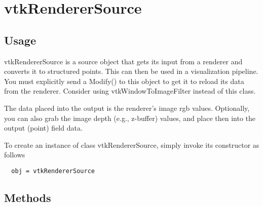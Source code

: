 \section{vtkRendererSource}

\subsection{Usage}

 vtkRendererSource is a source object that gets its input from a 
 renderer and converts it to structured points. This can then be 
 used in a visualization pipeline. You must explicitly send a 
 Modify() to this object to get it to reload its data from the
 renderer. Consider using vtkWindowToImageFilter instead of this
 class.

 The data placed into the output is the renderer's image rgb values.
 Optionally, you can also grab the image depth (e.g., z-buffer) values, and
 place then into the output (point) field data.

To create an instance of class vtkRendererSource, simply
invoke its constructor as follows
\begin{verbatim}
  obj = vtkRendererSource
\end{verbatim}
\subsection{Methods}

